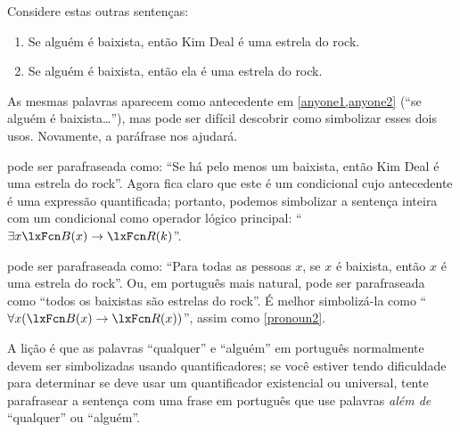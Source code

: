 Considere estas outras sentenças:
	\begin{enumerate}
\item\label{anyone1} Se alguém é baixista, então Kim Deal é uma estrela do rock.
\item\label{anyone2} Se alguém é baixista, então ela é uma estrela do rock.
	\end{enumerate}
As mesmas palavras aparecem como antecedente em \cref*{anyone1,anyone2} (\textquotedblleft se alguém é baixista\ldots\textquotedblright{}), mas pode ser difícil descobrir como simbolizar esses dois usos. Novamente, a paráfrase nos ajudará.

 pode ser parafraseada como: \textquotedblleft Se há pelo menos um baixista, então Kim Deal é uma estrela do rock\textquotedblright{}. Agora fica claro que este é um condicional cujo antecedente é uma expressão quantificada; portanto, podemos simbolizar a sentença inteira com um condicional como operador lógico principal: \textquotedblleft $\exists x \atom{B}{x} \eif \atom{R}{k}$\textquotedblright{}.

 pode ser parafraseada como: \textquotedblleft Para todas as pessoas $x$, se $x$ é baixista, então $x$ é uma estrela do rock\textquotedblright{}. Ou, em português mais natural, pode ser parafraseada como \textquotedblleft todos os baixistas são estrelas do rock\textquotedblright{}. É melhor simbolizá-la como \textquotedblleft $\forall x(\atom{B}{x} \eif \atom{R}{x})$\textquotedblright{}, assim como \cref*{pronoun2}.

A lição é que as palavras \textquotedblleft qualquer\textquotedblright{} e \textquotedblleft alguém\textquotedblright{} em português normalmente devem ser simbolizadas usando quantificadores; se você estiver tendo dificuldade para determinar se deve usar um quantificador existencial ou universal, tente parafrasear a sentença com uma frase em português que use palavras \emph{além de} \textquotedblleft qualquer\textquotedblright{} ou \textquotedblleft alguém\textquotedblright{}.



